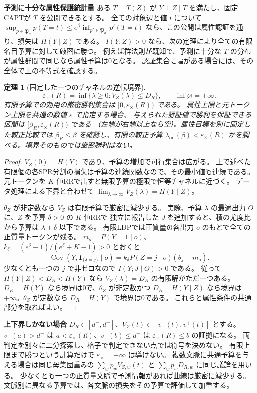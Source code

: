 \documentclass[a4paper,11pt]{ltjsarticle}
\theoremstyle{jp}
\newtheorem{thm}{定理}
\newcommand{\ind}{\mathbf 1}
\newcommand{\Dc}{D_R}
\newcommand{\V}{V_Z}
\newcommand{\ecr}{\varepsilon_\times}
\newcommand{\law}{\mathfrak P}
\newcommand{\para}[1]{\par\Needspace{3\baselineskip}\addvspace{.6\baselineskip}\noindent\textbf{#1}\enspace}
\begin{document}
\para{予測に十分な属性保護統計量}
ある \(T=T(Z)\) が \(Y\perp Z\mid T\) を満たし、固定CAPTが \(T\) を公開できるとする。
全ての対象辺と値 \(t\) について
\(\sup_{p\in\law_g}p(T=t)\le e^\beta\inf_{p'\in\law_{g'}}p'(T=t)\)
なら、この公開は属性認証を通り、損失は \(H(Y\mid Z)\) である。
\(I(Y;Z)>0\) なら、次の定理により全ての有限名目予算に対して厳密に勝つ。
例えば群法則が既知で、予測に十分な \(T\) の分布が属性群間で同じなら属性予算は0となる。
認証集合に幅がある場合には、その全体で上の不等式を確認する。

\begin{thm}[固定した一つのチャネルの逆転境界]\label{th:cross}
\[
 \ecr(R)=\inf\{\lambda\ge0:\V(\lambda)\le\Dc\},\qquad \inf\varnothing=+\infty .
\]
有限予算での効用の厳密勝利集合は \([0,\ecr(R))\) である。
属性上限と元トークン上限を共通の数値 \(\varepsilon\) で指定する場合、
与えられた認証値で勝利を保証できる区間は \([\beta_R,\ecr(R))\) である
（左端が右端以上なら空）。属性目標を別に固定した較正比較では
\(\beta_R\le\beta\) を確認し、有限の較正予算 \(\lambda_{\mathrm{cal}}(\beta)<\ecr(R)\)
かを調べる。境界そのものでは厳密勝利はない。
\end{thm}
\begin{proof}
\(\V(0)=H(Y)\) であり、予算の増加で可行集合は広がる。
上で述べた有限個の各SPR分割の損失は予算の連続関数なので、その最小値も連続である。
元トークンを \(K\) 値RRで出すと無限予算の極限で恒等チャネルに近づく。
データ処理による下界と合わせて \(\lim_{\lambda\to\infty}\V(\lambda)=H(Y\mid Z)\)。

\(\theta_Z\) が非定数なら \(\V\) は有限予算で厳密に減少する。
実際、予算 \(\lambda\) の最適出力 \(O\) に、\(Z\) を予算 \(\delta>0\) の \(K\) 値RRで
独立に報告した \(J\) を追加すると、積の尤度比から予算は \(\lambda+\delta\) 以下である。
有限LDPでは正質量の各出力 \(o\) のもとで全ての正質量トークンが残る。
\(m_o=P(Y=1\mid o)\)、\(k_\delta=(e^\delta-1)/(e^\delta+K-1)>0\) とおくと
\[
 \operatorname{Cov}(Y,\ind_{\{J=j\}}\mid o)
 =k_\delta P(Z=j\mid o)(\theta_j-m_o).
\]
少なくとも一つの \(j\) で非ゼロなので \(I(Y;J\mid O)>0\) である。
従って \(H(Y\mid Z)<\Dc<H(Y)\) なら \(\V(\lambda)=\Dc\) の有限解がただ一つある。
\(\Dc=H(Y)\) なら境界は0で、\(\theta_Z\) が非定数かつ \(\Dc=H(Y\mid Z)\)
なら境界は \(+\infty\)。\(\theta_Z\) が定数なら \(\Dc=H(Y)\) で境界は0である。
これらと属性条件の共通部分を取ればよい。
\end{proof}

\para{上下界しかない場合}
\(\Dc\in[d^-,d^+]\)、\(\V(t)\in[v^-(t),v^+(t)]\) とする。
\(v^-(a)>d^+\) は \(a<\ecr(R)\)、\(v^+(b)\le d^-\) は \(\ecr(R)\le b\) の証拠になる。
両判定を別々に二分探索し、格子で判定できない点では符号を決めない。
有限上限まで勝つという計算だけで \(\ecr=+\infty\) は導けない。
複数文脈に共通予算を与える場合は同じ母集団重みの \(\sum_w p_w V_{Z,w}(t)\)
と \(\sum_w p_wD_{R,w}\) に同じ議論を用いる。
少なくとも一つの正質量文脈で予測情報があれば曲線は厳密に減少する。
文脈別に異なる予算では、各文脈の損失をその予算で評価して加重する。
\end{document}
